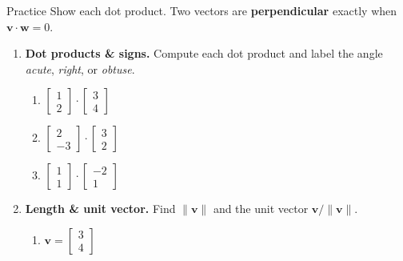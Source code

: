 \documentclass[10pt]{article}
\newcommand{\vv}{\mathbf{v}}
\newcommand{\ww}{\mathbf{w}}
\begin{document}
\namedateperiod

\vspace{0.12in}

\begin{notesbox}{Practice}
Show each dot product. Two vectors are \textbf{perpendicular} exactly when
$\vv\cdot\ww=0$.

\begin{enumerate}[leftmargin=1.9em, itemsep=12pt]
  \item \textbf{Dot products \& signs.} Compute each dot product and label the angle
        \emph{acute}, \emph{right}, or \emph{obtuse}.
    \begin{enumerate}[label=(\alph*), leftmargin=1.8em, itemsep=4pt]
      \item $\begin{bmatrix} 1 \\ 2 \end{bmatrix}\cdot\begin{bmatrix} 3 \\ 4 \end{bmatrix}$ \hfill {}
      \item $\begin{bmatrix} 2 \\ -3 \end{bmatrix}\cdot\begin{bmatrix} 3 \\ 2 \end{bmatrix}$ \hfill {}
      \item $\begin{bmatrix} 1 \\ 1 \end{bmatrix}\cdot\begin{bmatrix} -2 \\ 1 \end{bmatrix}$ \hfill {}
    \end{enumerate}
  \item \textbf{Length \& unit vector.} Find $\|\vv\|$ and the unit vector $\vv/\|\vv\|$.
    \begin{enumerate}[label=(\alph*), leftmargin=1.8em, itemsep=4pt]
      \item $\vv=\begin{bmatrix} 3 \\ 4 \end{bmatrix}$ \hfill \ans{$\|\vv\|=5$; unit $\begin{bsmallmatrix} 3/5\\4/5 \end{bsmallmatrix}$}

\end{enumerate}
\end{enumerate}
\end{notesbox}
\end{document}
